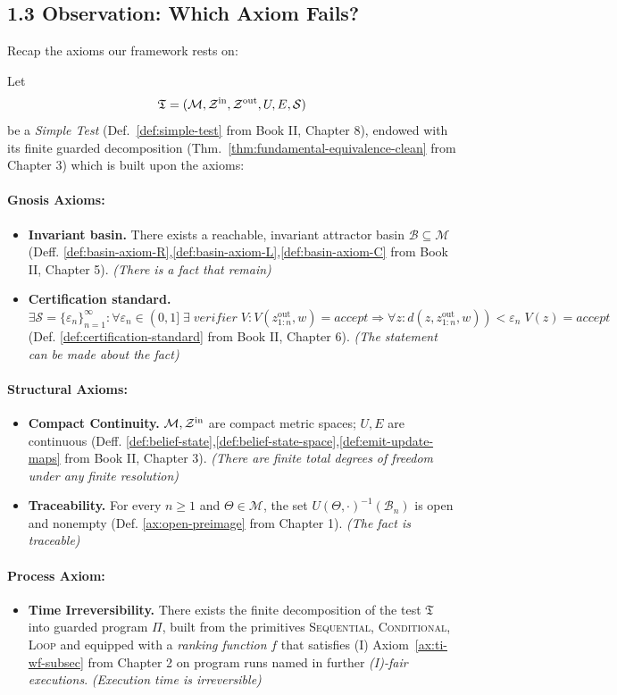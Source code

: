 \documentclass[12pt]{article}
\theoremstyle{definition}
\theoremstyle{plain}
\begin{document}
\subsection*{1.3 Observation: Which Axiom Fails?}
Recap the axioms our framework rests on:


\medskip
Let 
\[
  \mathfrak T=(\mathcal M,\mathcal Z^{\rm in},\mathcal Z^{\rm out},U,E,\mathcal S)
\]
be a \emph{Simple Test} (Def.~\ref{def:simple-test} from Book II, Chapter 8), endowed with its finite guarded decomposition (Thm.~\ref{thm:fundamental-equivalence-clean} from Chapter 3) which is built upon the axioms:
\paragraph{Gnosis Axioms:}
\begin{itemize}
  \item[(F)] \textbf{Invariant basin.} There exists a reachable, invariant attractor basin $\mathcal B\subseteq\mathcal M$ (Deff. \ref{def:basin-axiom-R},\ref{def:basin-axiom-L},\ref{def:basin-axiom-C} from Book II, Chapter 5). \emph{(There is a fact that remain)}
  \item[(S)] \textbf{Certification  standard.} $\exists \mathcal{S} = \{\varepsilon_n\}_{n=1}^\infty: \forall \varepsilon_n \in (0, 1]\; \exists\; verifier \; V: V(z^{\text{out}}_{1:n}, w)=accept \Longrightarrow \forall z: d(z,z^{\text{out}}_{1:n}, w))<\varepsilon_n\; V(z)=accept$ (Def. \ref{def:certification-standard} from Book II, Chapter 6). \emph{(The statement can be made about the fact)} 
\end{itemize}
\paragraph{Structural Axioms:}
\begin{itemize}
    \item[(C)] \textbf{Compact Continuity.} $\mathcal M,\mathcal Z^{\rm in}$ are compact metric spaces; $U,E$ are continuous (Deff. \ref{def:belief-state},\ref{def:belief-state-space},\ref{def:emit-update-maps} from Book II, Chapter 3). \emph{(There are finite total degrees of freedom under any finite resolution)}
    \item[(T)] \textbf{Traceability.} For every $n\ge1$ and $\Theta\in\mathcal M$, the set $U(\Theta,\cdot)^{-1}(\mathcal B_n)$ is open and nonempty (Def. \ref{ax:open-preimage} from Chapter 1). \emph{(The fact is traceable)}
\end{itemize}
\paragraph{Process Axiom:}
\label{def:ti-wf-fair-execution}
\begin{itemize}
    \item[(I)] \textbf{Time Irreversibility.} There exists the finite decomposition of the test $\mathfrak T$ into guarded program \(\Pi\), built from the primitives \textsc{Sequential}, \textsc{Conditional}, \textsc{Loop} and equipped with a \emph{ranking function} \(f\) that satisfies (I) Axiom~\ref{ax:ti-wf-subsec} from Chapter 2 on program runs named in further \emph{(I)-fair executions}. \emph{(Execution time is irreversible)}
\end{itemize}
\end{document}
